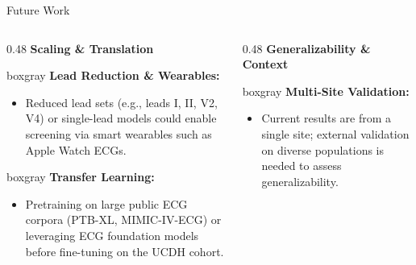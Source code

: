 \documentclass[10pt,aspectratio=169]{beamer}
\newcommand{\Raleway}{\sffamily}
\begin{document}
\begin{frame}{Future Work}
  \begin{columns}[T, onlytextwidth]
    
    \begin{column}{0.48\textwidth}
      {\small\Raleway\bfseries\color{aggieblue} Scaling \& Translation}\\[0.4em]
      
      \begin{beamercolorbox}[wd=\textwidth,rounded=true,leftskip=0.6em,rightskip=0.6em,topskip=0.5em,bottomskip=0.5em]{boxgray}
        \color{coolgray}
        \textbf{Lead Reduction \& Wearables:}
        \begin{itemize}
          \item Reduced lead sets (e.g., leads I, II, V2, V4) or single-lead models could enable screening via smart wearables such as Apple Watch ECGs.
        \end{itemize}
      \end{beamercolorbox}
      
      \vspace{0.5em}
      
      \begin{beamercolorbox}[wd=\textwidth,rounded=true,leftskip=0.6em,rightskip=0.6em,topskip=0.5em,bottomskip=0.5em]{boxgray}
        \color{coolgray}
        \textbf{Transfer Learning:}
        \begin{itemize}
          \item Pretraining on large public ECG corpora (PTB-XL, MIMIC-IV-ECG) or leveraging ECG foundation models before fine-tuning on the UCDH cohort.
        \end{itemize}
      \end{beamercolorbox}
    \end{column}
    
    \begin{column}{0.48\textwidth}
      {\small\Raleway\bfseries\color{aggieblue} Generalizability \& Context}\\[0.4em]
      
      \begin{beamercolorbox}[wd=\textwidth,rounded=true,leftskip=0.6em,rightskip=0.6em,topskip=0.5em,bottomskip=0.5em]{boxgray}
        \color{coolgray}
        \textbf{Multi-Site Validation:}
        \begin{itemize}
          \item Current results are from a single site; external validation on diverse populations is needed to assess generalizability.
        \end{itemize}
      \end{beamercolorbox}
      

\end{column}
\end{columns}
\end{frame}
\end{document}
